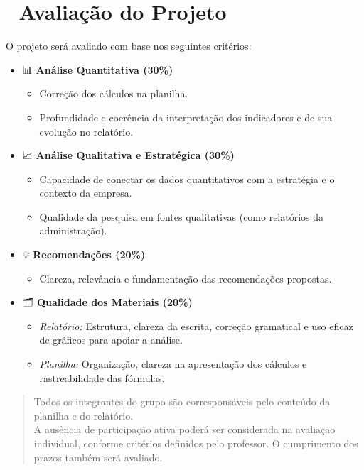 \documentclass[
  a4paper,
]{book}
\providecommand{\tightlist}{%
  \setlength{\itemsep}{0pt}\setlength{\parskip}{0pt}}\usepackage{longtable,booktabs,array}
\begin{document}
\section{🧮 Avaliação do Projeto}\label{avaliauxe7uxe3o-do-projeto}

O projeto será avaliado com base nos seguintes critérios:

\begin{itemize}
\item
  📊 \textbf{Análise Quantitativa (30\%)}

  \begin{itemize}
  \tightlist
  \item
    Correção dos cálculos na planilha.
  \item
    Profundidade e coerência da interpretação dos indicadores e de sua
    evolução no relatório.
  \end{itemize}
\item
  📈 \textbf{Análise Qualitativa e Estratégica (30\%)}

  \begin{itemize}
  \tightlist
  \item
    Capacidade de conectar os dados quantitativos com a estratégia e o
    contexto da empresa.
  \item
    Qualidade da pesquisa em fontes qualitativas (como relatórios da
    administração).
  \end{itemize}
\item
  💡 \textbf{Recomendações (20\%)}

  \begin{itemize}
  \tightlist
  \item
    Clareza, relevância e fundamentação das recomendações propostas.
  \end{itemize}
\item
  🗂️ \textbf{Qualidade dos Materiais (20\%)}

  \begin{itemize}
  \tightlist
  \item
    \emph{Relatório:} Estrutura, clareza da escrita, correção gramatical
    e uso eficaz de gráficos para apoiar a análise.
  \item
    \emph{Planilha:} Organização, clareza na apresentação dos cálculos e
    rastreabilidade das fórmulas.
  \end{itemize}
\end{itemize}

\begin{quote}
Todos os integrantes do grupo são corresponsáveis pelo conteúdo da
planilha e do relatório.\\
A ausência de participação ativa poderá ser considerada na avaliação
individual, conforme critérios definidos pelo professor. O cumprimento
dos prazos também será avaliado.
\end{quote}
\end{document}
